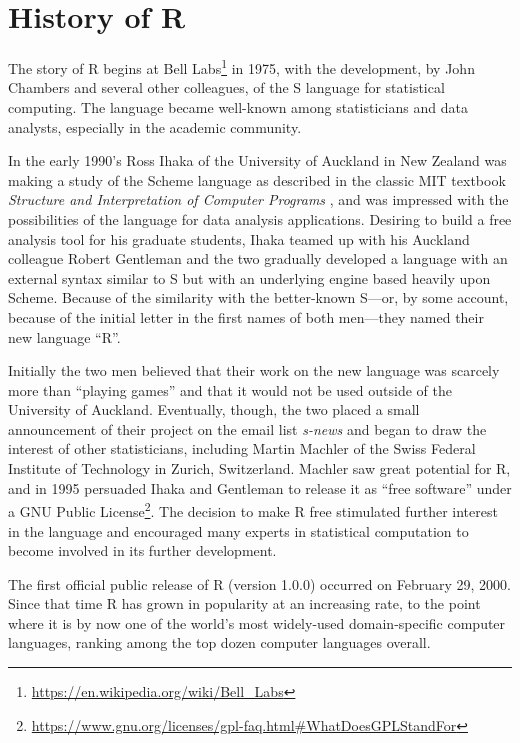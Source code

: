 \documentclass[]{book}
\let\rmarkdownfootnote\footnote%
\def\footnote{\protect\rmarkdownfootnote}
\renewcommand{\href}[2]{#2\footnote{\url{#1}}}
\renewcommand{\href}[2]{#2\footnote{\url{#1}}}
\theoremstyle{definition}
\theoremstyle{definition}
\theoremstyle{definition}
\theoremstyle{remark}
\begin{document}
\section{History of R}\label{history-of-r}

The story of R begins at
\href{https://en.wikipedia.org/wiki/Bell_Labs}{Bell Labs} in 1975, with
the development, by John Chambers and several other colleagues, of the S
language for statistical computing. The language became well-known among
statisticians and data analysts, especially in the academic community.

In the early 1990's Ross Ihaka of the University of Auckland in New
Zealand was making a study of the Scheme language as described in the
classic MIT textbook \emph{Structure and Interpretation of Computer
Programs} \citep{AbelsonSussman}, and was impressed with the
possibilities of the language for data analysis applications. Desiring
to build a free analysis tool for his graduate students, Ihaka teamed up
with his Auckland colleague Robert Gentleman and the two gradually
developed a language with an external syntax similar to S but with an
underlying engine based heavily upon Scheme. Because of the similarity
with the better-known S---or, by some account, because of the initial
letter in the first names of both men---they named their new language
``R''.

Initially the two men believed that their work on the new language was
scarcely more than ``playing games'' and that it would not be used
outside of the University of Auckland. Eventually, though, the two
placed a small announcement of their project on the email list
\emph{s-news} and began to draw the interest of other statisticians,
including Martin Machler of the Swiss Federal Institute of Technology in
Zurich, Switzerland. Machler saw great potential for R, and in 1995
persuaded Ihaka and Gentleman to release it as ``free software'' under a
\href{https://www.gnu.org/licenses/gpl-faq.html\#WhatDoesGPLStandFor}{GNU
Public License}. The decision to make R free stimulated further interest
in the language and encouraged many experts in statistical computation
to become involved in its further development.

The first official public release of R (version 1.0.0) occurred on
February 29, 2000. Since that time R has grown in popularity at an
increasing rate, to the point where it is by now one of the world's most
widely-used domain-specific computer languages, ranking among the top
dozen computer languages overall.
\end{document}
